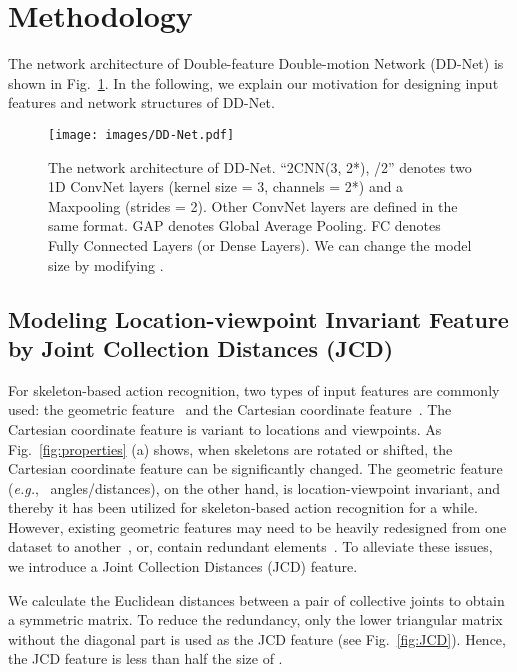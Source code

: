 \documentclass[journal]{IEEEtran}
\newcommand{\eg}{{\it e.g.}}
\begin{document}
\vspace{0.5cm}
\section{Methodology}

The network architecture of Double-feature Double-motion Network (DD-Net) is shown in Fig.~\textcolor{red}{\ref{fig:DD-Net}}. In the following, we explain our motivation for designing input features and network structures of DD-Net.

\begin{figure}[!htb]
\centering
  \texttt{[image: images/DD-Net.pdf]}
  \caption{The network architecture of DD-Net. ``2CNN(3, 2*), /2'' denotes two 1D ConvNet layers (kernel size = 3, channels = 2*) and a Maxpooling (strides = 2). Other ConvNet layers are defined in the same format. GAP denotes Global Average Pooling. FC denotes Fully Connected Layers (or Dense Layers). We can change the model size by modifying .}
  \label{fig:DD-Net}
\end{figure}


\subsection{Modeling Location-viewpoint Invariant Feature by Joint Collection Distances (JCD)}

For skeleton-based action recognition, two types of input features are commonly used: the geometric feature~\cite{chen2011learning,zhang2018fusing} and the Cartesian coordinate feature~\cite{wang2017modeling, song2017end, yan2018spatial,hou2018spatial,zolfaghari2017chained}. The Cartesian coordinate feature is variant to locations and viewpoints. As Fig.~\textcolor{red}{\ref{fig:properties}} (a) shows, when skeletons are rotated or shifted, the Cartesian coordinate feature can be significantly changed. The geometric feature (\eg,~ angles/distances), on the other hand, is location-viewpoint invariant, and thereby it has been utilized for skeleton-based action recognition for a while. However, existing geometric features may need to be heavily redesigned from one dataset to another~\cite{chen2011learning,zhang2018fusing}, or, contain redundant elements~\cite{li2017skeleton}. To alleviate these issues, we introduce a Joint Collection Distances (JCD) feature.

We calculate the Euclidean distances between a pair of collective joints to obtain a symmetric matrix. To reduce the redundancy, only the lower triangular matrix without the diagonal part is used as the JCD feature (see Fig.~\textcolor{red}{\ref{fig:JCD}}). Hence, the JCD feature is less than half the size of \cite{li2017skeleton}. 
\end{document}
